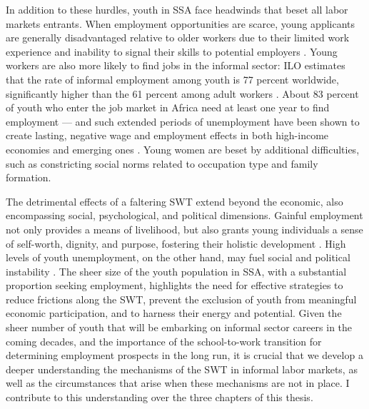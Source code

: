 \documentclass[
  a4paper, twoside, 12pt]{book}
\begin{document}
\noindent In addition to these hurdles, youth in SSA face headwinds that beset all labor markets entrants. When employment opportunities are scarce, young applicants are generally disadvantaged relative to older workers due to their limited work experience and inability to signal their skills to potential employers \autocite{acemoglu1998}. Young workers are also more likely to find jobs in the informal sector: ILO estimates that the rate of informal employment among youth is 77 percent worldwide, significantly higher than the 61 percent among adult workers \autocite{bonnet2018}. About 83 percent of youth who enter the job market in Africa need at least one year to find employment \autocite{africandevelopmentbank2022} --- and such extended periods of unemployment have been shown to create lasting, negative wage and employment effects in both high-income economies \autocite{moller2015,petreski2016,schmillen2017,emmenegger2017} and emerging ones \autocite{tiongson2007,mojsoska-blazevski2017}. Young women are beset by additional difficulties, such as constricting social norms related to occupation type and family formation.

The detrimental effects of a faltering SWT extend beyond the economic, also encompassing social, psychological, and political dimensions. Gainful employment not only provides a means of livelihood, but also grants young individuals a sense of self-worth, dignity, and purpose, fostering their holistic development \autocite{mains2011}. High levels of youth unemployment, on the other hand, may fuel social and political instability \autocite{urdal2006}. The sheer size of the youth population in SSA, with a substantial proportion seeking employment, highlights the need for effective strategies to reduce frictions along the SWT, prevent the exclusion of youth from meaningful economic participation, and to harness their energy and potential. Given the sheer number of youth that will be embarking on informal sector careers in the coming decades, and the importance of the school-to-work transition for determining employment prospects in the long run, it is crucial that we develop a deeper understanding the mechanisms of the SWT in informal labor markets, as well as the circumstances that arise when these mechanisms are not in place. I contribute to this understanding over the three chapters of this thesis.
\end{document}
